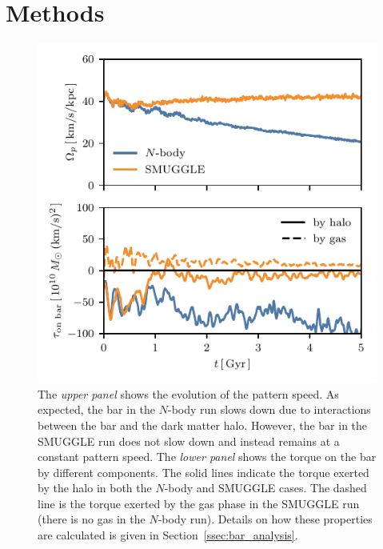 \documentclass[twocolumn,linenumbers,trackchanges]{aastex631}
\newcommand{\Nbody}{$N$-body}
\newcommand{\SMUGGLE}{SMUGGLE}
\begin{document}

\section{Methods}
\label{sec:methods}
\begin{figure}
    \centering
    \includegraphics[width=\columnwidth]{fig/ps_torque.pdf}
    \caption{The \textit{upper panel} shows the evolution of the pattern speed.
    As expected, the bar in the \Nbody{} run slows down due to interactions
    between the bar and the dark matter halo. However, the bar in the \SMUGGLE{}
    run does not slow down and instead remains at a constant pattern speed. The
    \textit{lower panel} shows the torque on the bar by different components.
    The solid lines indicate the torque exerted by the halo in both the \Nbody{}
    and \SMUGGLE{} cases. The dashed line is the torque exerted by the gas phase in
    the \SMUGGLE{} run (there is no gas in the \Nbody{} run). Details on how these
    properties are calculated is given in Section~\ref{ssec:bar_analysis}.}\label{fig:prop}
\end{figure}
\end{document}
